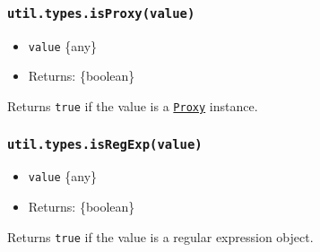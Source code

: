 \subsubsection{\texorpdfstring{\texttt{util.types.isProxy(value)}}{util.types.isProxy(value)}}\label{util.types.isproxyvalue}

\begin{itemize}
\tightlist
\item
  \texttt{value} \{any\}
\item
  Returns: \{boolean\}
\end{itemize}

Returns \texttt{true} if the value is a
\href{https://developer.mozilla.org/en-US/docs/Web/JavaScript/Reference/Global_Objects/Proxy}{\texttt{Proxy}}
instance.

\begin{Shaded}
\begin{Highlighting}[]
\OperatorTok{=}\NormalTok{ \{\}}\OperatorTok{;}
\OperatorTok{=}  \OperatorTok{,}\NormalTok{ \{\})}\OperatorTok{;}
\OperatorTok{;}  
\OperatorTok{;}  
\end{Highlighting}
\end{Shaded}

\subsubsection{\texorpdfstring{\texttt{util.types.isRegExp(value)}}{util.types.isRegExp(value)}}\label{util.types.isregexpvalue}

\begin{itemize}
\tightlist
\item
  \texttt{value} \{any\}
\item
  Returns: \{boolean\}
\end{itemize}

Returns \texttt{true} if the value is a regular expression object.

\begin{Shaded}
\begin{Highlighting}[]
\NormalTok{(}\NormalTok{)}\OperatorTok{;}  
\NormalTok{(} \NormalTok{(}\NormalTok{))}\OperatorTok{;}  
\end{Highlighting}
\end{Shaded}

